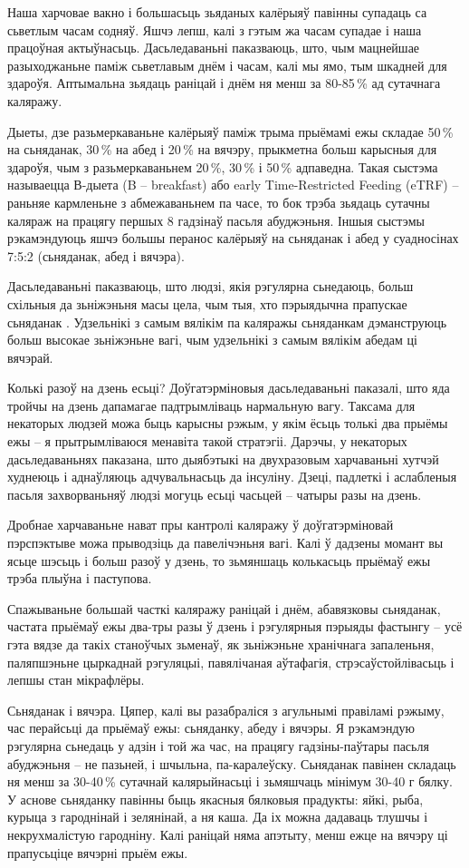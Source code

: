 Наша харчовае вакно і большасьць зьяданых калёрыяў павінны супадаць са сьветлым часам содняў. Яшчэ лепш, калі з гэтым жа часам супадае і наша працоўная актыўнасьць. Дасьледаваньні паказваюць, што, чым мацнейшае разыходжаньне паміж сьветлавым днём і часам, калі мы ямо, тым шкадней для здароўя. Аптымальна зьядаць раніцай і днём ня менш за 80-85\,\% ад сутачнага каляражу.

Дыеты, дзе разьмеркаваньне калёрыяў паміж трыма прыёмамі ежы складае 50\,\% на сьняданак, 30\,\% на абед і 20\,\% на вячэру, прыкметна больш карысныя для здароўя, чым з разьмеркаваньнем 20\,\%, 30\,\% і 50\,\% адпаведна. Такая сыстэма называецца В-дыета (B – breakfast) або early Time-Restricted Feeding (eTRF) – раньняе кармленьне з абмежаваньнем па часе, то бок трэба зьядаць сутачны каляраж на працягу першых 8 гадзінаў пасьля абуджэньня. Іншыя сыстэмы рэкамэндуюць яшчэ большы перанос калёрыяў на сьняданак і абед у суадносінах 7:5:2 (сьняданак, абед і вячэра).

Дасьледаваньні паказваюць, што людзі, якія рэгулярна сьнедаюць, больш схільныя да зьніжэньня масы цела, чым тыя, хто пэрыядычна прапускае сьняданак . Удзельнікі з самым вялікім па каляражы сьняданкам дэманструюць больш высокае зьніжэньне вагі, чым удзельнікі з самым вялікім абедам ці вячэрай.

Колькі разоў на дзень есьці? Доўгатэрміновыя дасьледаваньні паказалі, што яда тройчы на дзень дапамагае падтрымліваць нармальную вагу. Таксама для некаторых людзей можа быць карысны рэжым, у якім ёсьць толькі два прыёмы ежы – я прытрымліваюся менавіта такой стратэгіі. Дарэчы, у некаторых дасьледаваньнях паказана, што дыябэтыкі на двухразовым харчаваньні хутчэй худнеюць і аднаўляюць адчувальнасьць да інсуліну. Дзеці, падлеткі і аслабленыя пасьля захворваньняў людзі могуць есьці часьцей – чатыры разы на дзень.

Дробнае харчаваньне нават пры кантролі каляражу ў доўгатэрміновай пэрспэктыве можа прыводзіць да павелічэньня вагі. Калі ў дадзены момант вы ясьце шэсьць і больш разоў у дзень, то зьмяншаць колькасьць прыёмаў ежы трэба плыўна і паступова.

Спажываньне большай часткі каляражу раніцай і днём, абавязковы сьняданак, частата прыёмаў ежы два-тры разы ў дзень і рэгулярныя пэрыяды фастынгу – усё гэта вядзе да такіх станоўчых зьменаў, як зьніжэньне хранічнага запаленьня, паляпшэньне цыркаднай рэгуляцыі, павялічаная аўтафагія, стрэсаўстойлівасьць і лепшы стан мікрафлёры.

Сьняданак і вячэра. Цяпер, калі вы разабраліся з агульнымі правіламі рэжыму, час перайсьці да прыёмаў ежы: сьняданку, абеду і вячэры. Я рэкамэндую рэгулярна сьнедаць у адзін і той жа час, на працягу гадзіны-паўтары пасьля абуджэньня – не пазьней, і шчыльна, па-каралеўску. Сьняданак павінен складаць ня менш за 30-40\,\% сутачнай калярыйнасьці і зьмяшчаць мінімум 30-40 г бялку. У аснове сьняданку павінны быць якасныя бялковыя прадукты: яйкі, рыба, курыца з гароднінай і зелянінай, а ня каша. Да іх можна дадаваць тлушчы і некрухмалістую гародніну. Калі раніцай няма апэтыту, менш ежце на вячэру ці прапусьціце вячэрні прыём ежы.

